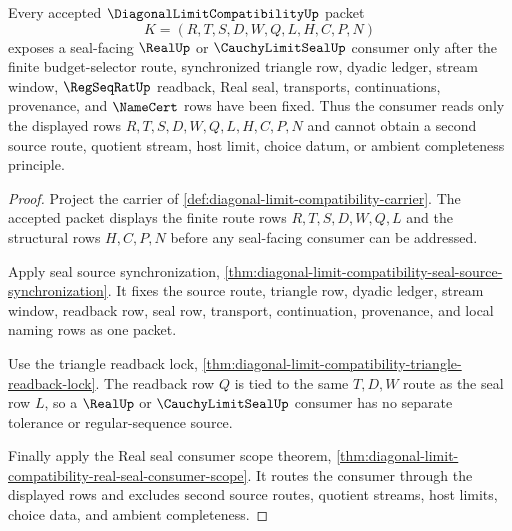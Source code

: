 \begin{theorem}
\label{thm:diagonal-limit-compatibility-seal-source-scope-row}
Every accepted $\DiagonalLimitCompatibilityUp$ packet
$$
K=(R,T,S,D,W,Q,L,H,C,P,N)
$$
exposes a seal-facing $\RealUp$ or $\CauchyLimitSealUp$ consumer only after the finite budget-selector route, synchronized triangle row, dyadic ledger, stream window, $\RegSeqRatUp$ readback, Real seal, transports, continuations, provenance, and $\NameCert$ rows have been fixed. Thus the consumer reads only the displayed rows $R,T,S,D,W,Q,L,H,C,P,N$ and cannot obtain a second source route, quotient stream, host limit, choice datum, or ambient completeness principle.
\end{theorem}
\begin{proof}
Project the carrier of \autoref{def:diagonal-limit-compatibility-carrier}. The accepted packet displays the finite route rows $R,T,S,D,W,Q,L$ and the structural rows $H,C,P,N$ before any seal-facing consumer can be addressed.

Apply seal source synchronization, \autoref{thm:diagonal-limit-compatibility-seal-source-synchronization}. It fixes the source route, triangle row, dyadic ledger, stream window, readback row, seal row, transport, continuation, provenance, and local naming rows as one packet.

Use the triangle readback lock, \autoref{thm:diagonal-limit-compatibility-triangle-readback-lock}. The readback row $Q$ is tied to the same $T,D,W$ route as the seal row $L$, so a $\RealUp$ or $\CauchyLimitSealUp$ consumer has no separate tolerance or regular-sequence source.

Finally apply the Real seal consumer scope theorem, \autoref{thm:diagonal-limit-compatibility-real-seal-consumer-scope}. It routes the consumer through the displayed rows and excludes second source routes, quotient streams, host limits, choice data, and ambient completeness.
\end{proof}

